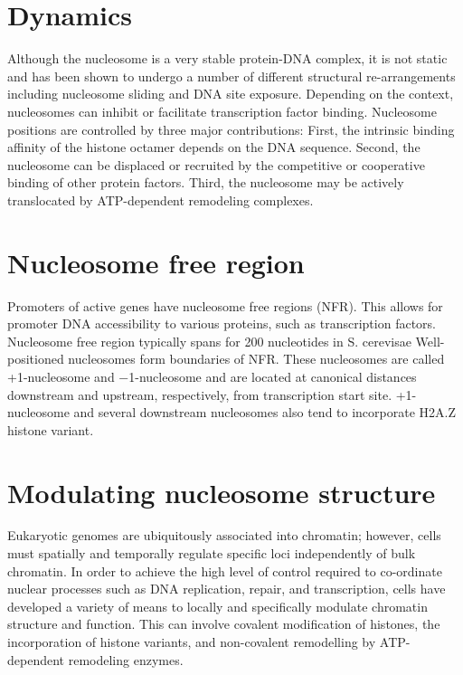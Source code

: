 \hypertarget{dynamics}{%
\section{Dynamics}\label{dynamics}}

Although the nucleosome is a very stable protein-DNA complex, it is not static and has been shown to undergo a number of different structural re-arrangements including nucleosome sliding and DNA site exposure. Depending on the context, nucleosomes can inhibit or facilitate transcription factor binding. Nucleosome positions are controlled by three major contributions: First, the intrinsic binding affinity of the histone octamer depends on the DNA sequence. Second, the nucleosome can be displaced or recruited by the competitive or cooperative binding of other protein factors. Third, the nucleosome may be actively translocated by ATP-dependent remodeling complexes.

\hypertarget{nucleosome-free-region}{%
\section{Nucleosome free region}\label{nucleosome-free-region}}

Promoters of active genes have nucleosome free regions (NFR). This allows for promoter DNA accessibility to various proteins, such as transcription factors. Nucleosome free region typically spans for 200 nucleotides in S. cerevisae Well-positioned nucleosomes form boundaries of NFR. These nucleosomes are called +1-nucleosome and −1-nucleosome and are located at canonical distances downstream and upstream, respectively, from transcription start site. +1-nucleosome and several downstream nucleosomes also tend to incorporate H2A.Z histone variant.

\hypertarget{modulating-nucleosome-structure}{%
\section{Modulating nucleosome structure}\label{modulating-nucleosome-structure}}

Eukaryotic genomes are ubiquitously associated into chromatin; however, cells must spatially and temporally regulate specific loci independently of bulk chromatin. In order to achieve the high level of control required to co-ordinate nuclear processes such as DNA replication, repair, and transcription, cells have developed a variety of means to locally and specifically modulate chromatin structure and function. This can involve covalent modification of histones, the incorporation of histone variants, and non-covalent remodelling by ATP-dependent remodeling enzymes.

